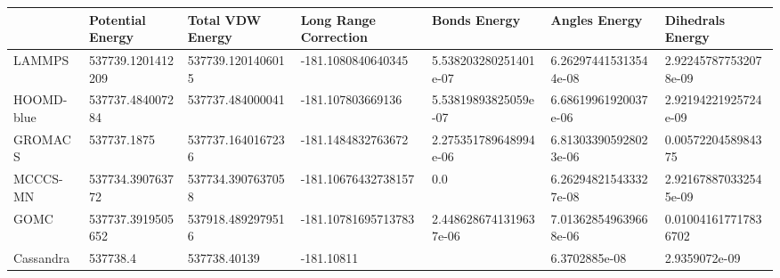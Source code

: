 \begin{table}[!ht]
    \centering
    \begin{tabular}{|l|l|l|l|l|l|l|}
    \hline
        ~ & Potential Energy & Total VDW Energy & Long Range Correction & Bonds Energy & Angles Energy & Dihedrals Energy \\ \hline
        LAMMPS & 537739.1201412209 & 537739.1201406015 & -181.1080840640345 & 5.538203280251401e-07 & 6.262974415313544e-08 & 2.922457877532078e-09 \\ \hline
        HOOMD-blue & 537737.484007284 & 537737.484000041 & -181.107803669136 & 5.53819893825059e-07 & 6.68619961920037e-06 & 2.92194221925724e-09 \\ \hline
        GROMACS & 537737.1875 & 537737.1640167236 & -181.1484832763672 & 2.275351789648994e-06 & 6.813033905928023e-06 & 0.0057220458984375 \\ \hline
        MCCCS-MN & 537734.390763772 & 537734.3907637058 & -181.10676432738157 & 0.0 & 6.262948215433327e-08 & 2.921678870332545e-09 \\ \hline
        GOMC & 537737.3919505652 & 537918.4892979516 & -181.10781695713783 & 2.4486286741319637e-06 & 7.013628549639668e-06 & 0.010041617717836702 \\ \hline
        Cassandra & 537738.4 & 537738.40139 & -181.10811 & ~ & 6.3702885e-08 & 2.9359072e-09 \\ \hline
    \end{tabular}
\end{table}
